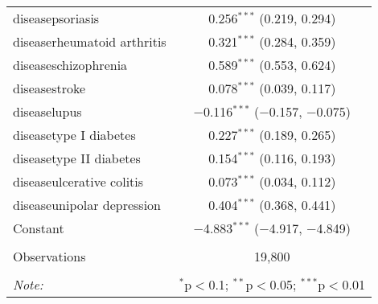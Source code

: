 \begin{table}[!htbp]
\begin{tabular}{@{\extracolsep{5pt}}lc}
  diseasepsoriasis & 0.256$^{***}$ (0.219, 0.294) \\ 
  diseaserheumatoid arthritis & 0.321$^{***}$ (0.284, 0.359) \\ 
  diseaseschizophrenia & 0.589$^{***}$ (0.553, 0.624) \\ 
  diseasestroke & 0.078$^{***}$ (0.039, 0.117) \\ 
  diseaselupus & $-$0.116$^{***}$ ($-$0.157, $-$0.075) \\ 
  diseasetype I diabetes & 0.227$^{***}$ (0.189, 0.265) \\ 
  diseasetype II diabetes & 0.154$^{***}$ (0.116, 0.193) \\ 
  diseaseulcerative colitis & 0.073$^{***}$ (0.034, 0.112) \\ 
  diseaseunipolar depression & 0.404$^{***}$ (0.368, 0.441) \\ 
  Constant & $-$4.883$^{***}$ ($-$4.917, $-$4.849) \\ 
 \hline \\[-1.8ex] 
Observations & 19,800 \\ 
\hline 
\hline \\[-1.8ex] 
\textit{Note:}  & \multicolumn{1}{r}{$^{*}$p$<$0.1; $^{**}$p$<$0.05; $^{***}$p$<$0.01} \\ 
\end{tabular} 
\end{table} 
